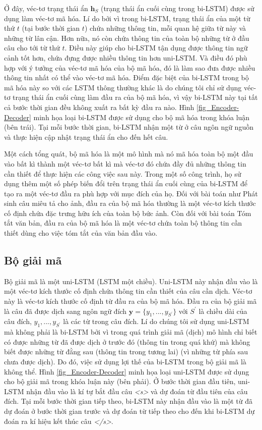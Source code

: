 Ở đây, véc-tơ trạng thái ẩn $\bm{h}_S$ (trạng thái ẩn cuối cùng trong bi-LSTM) được sử dụng làm véc-tơ mã hóa. Lí do bởi vì trong bi-LSTM, trạng thái ẩn của một từ thứ $t$ (tại bước thời gian $t$) chứa những thông tin, mỗi quan hệ giữa từ này và những từ lân cận. Hơn nữa, nó còn chứa thông tin của toàn bộ những từ ở đầu câu cho tới từ thứ $t$. Điều này giúp cho bi-LSTM tận dụng được thông tin ngữ cảnh tốt hơn, chứa đựng được nhiều thông tin hơn uni-LSTM. Và điều đó phù hợp với ý tưởng của véc-tơ mã hóa của bộ mã hóa, đó là làm sao đưa được nhiều thông tin nhất có thể vào véc-tơ mã hóa. Điểm đặc biệt của bi-LSTM trong bộ mã hóa này so với các LSTM thông thường khác là do chúng tôi chỉ sử dụng véc-tơ trạng thái ẩn cuối cùng làm đầu ra của bộ mã hóa, vì vậy bi-LSTM này tại tất cả bước thời gian đều không xuất ra bất kỳ đầu ra nào. Hình \ref{fig_Encoder-Decoder} minh họa loại bi-LSTM được sử dụng cho bộ mã hóa trong khóa luận (bên trái). Tại mỗi bước thời gian, bi-LSTM nhận một từ ở câu ngôn ngữ nguồn và thực hiện cập nhật trạng thái ẩn cho đến hết câu.

Một cách tổng quát, bộ mã hóa là một mô hình mà nó mã hóa toàn bộ một đầu vào bất kì thành một véc-tơ bất kì mà véc-tơ đó chứa đầy đủ những thông tin cần thiết để thực hiện các công việc sau này. Trong một số công trình, họ sử dụng thêm một số phép biến đổi trên trạng thái ẩn cuối cùng của bi-LSTM để tạo ra một véc-tơ đầu ra phù hợp với mục đích của họ. Đối với bài toán như Phát sinh câu miêu tả cho ảnh, đầu ra của bộ mã hóa thường là một véc-tơ kích thước cố định chứa đặc trưng hữu ích của toàn bộ bức ảnh. Còn đối với bài toán Tóm tắt văn bản, đầu ra của bộ mã hóa là một véc-tơ chứa toàn bộ thông tin cần thiết dùng cho việc tóm tắt của văn bản đầu vào.

\subsection{Bộ giải mã}
Bộ giải mã là một uni-LSTM (LSTM một chiều). Uni-LSTM này nhận đầu vào là một véc-tơ kích thước cố định chứa thông tin cần thiết của câu cần dịch. Véc-tơ này là véc-tơ kích thước cố định từ đầu ra của bộ mã hóa. Đầu ra của bộ giải mã là câu đã được dịch sang ngôn ngữ đích $\bm{y} = \{y_1, ..., y_{S^{'}}\}$ với $S^{'}$ là chiều dài của câu đích, $y_1, ...,y_{S^{'}}$ là các từ trong câu đích.
Lí do chúng tôi sử dụng uni-LSTM mà không phải là bi-LSTM bởi vì trong quá trình giải mã (dịch) mô hình chỉ biết có được những từ đã được dịch ở trước đó (thông tin trong quá khứ) mà không biết được những từ đằng sau (thông tin trong tương lai) (vì những từ phía sau chưa được dịch). Do đó, việc sử dụng lợi thế của bi-LSTM trong bộ giải mã là không thể. Hình \ref{fig_Encoder-Decoder} minh họa loại uni-LSTM được sử dụng cho bộ giải mã trong khóa luận này (bên phải). Ở bước thời gian đầu tiên, uni-LSTM nhận đầu vào là kí tự bắt đầu câu \textit{<s>} và dự đoán từ đầu tiên của câu đích. Tại mỗi bước thời gian tiếp theo, bi-LSTM này nhận đầu vào là một từ đã dự đoán ở bước thời gian trước và dự đoán từ tiếp theo cho đến khi bi-LSTM dự đoán ra kí hiệu kết thúc câu \textit{</s>}.

